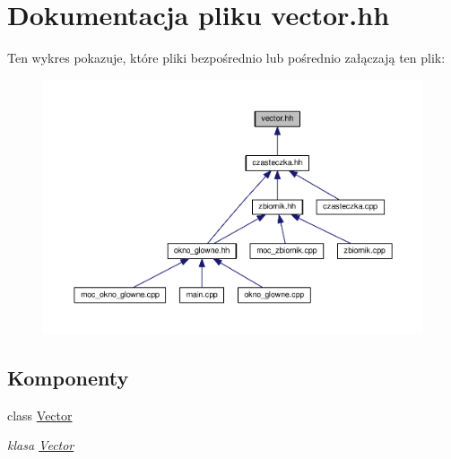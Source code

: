 \hypertarget{vector_8hh}{\section{Dokumentacja pliku vector.\-hh}
\label{vector_8hh}
}
Ten wykres pokazuje, które pliki bezpośrednio lub pośrednio załączają ten plik\-:\nopagebreak
\begin{figure}[H]
\begin{center}
\leavevmode
\includegraphics[width=350pt]{vector_8hh__dep__incl}
\end{center}
\end{figure}
\subsection*{Komponenty}
\begin{DoxyCompactItemize}
\item 
class \hyperlink{class_vector}{Vector}
\begin{DoxyCompactList}\small\item\em klasa \hyperlink{class_vector}{Vector} \end{DoxyCompactList}\end{DoxyCompactItemize}
